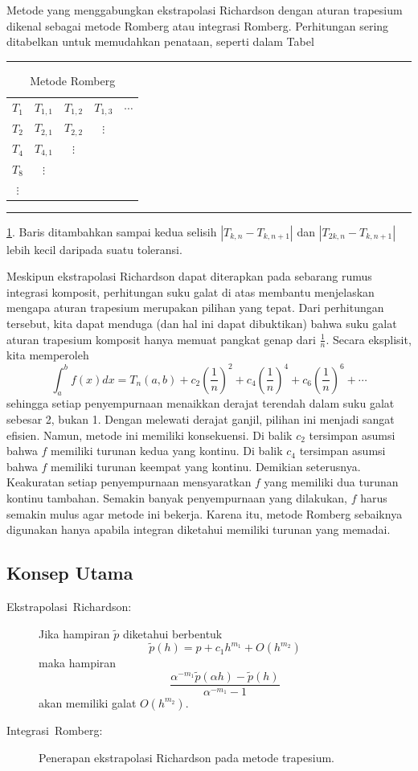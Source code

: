 Metode yang menggabungkan ekstrapolasi Richardson dengan aturan trapesium
dikenal sebagai metode Romberg atau integrasi Romberg.
Perhitungan sering ditabelkan untuk memudahkan penataan, seperti dalam
Tabel 
\begin{table}
\hrule \caption{\label{tab:Romberg}Metode Romberg}

\centering{}\medskip{}
\begin{tabular}{ccccc}
$T_{1}$ & $T_{1,1}$ & $T_{1,2}$ & $T_{1,3}$ & $\cdots$\tabularnewline
$T_{2}$ & $T_{2,1}$ & $T_{2,2}$ & $\vdots$ & \tabularnewline
$T_{4}$ & $T_{4,1}$ & $\vdots$ &  & \tabularnewline
$T_{8}$ & $\vdots$ &  &  & \tabularnewline
$\vdots$ &  &  &  & \tabularnewline
\end{tabular}\medskip{}
\hrule 
\end{table}
 \ref{tab:Romberg}. Baris ditambahkan sampai kedua selisih $\left|T_{k,n}-T_{k,n+1}\right|$
dan $\left|T_{2k,n}-T_{k,n+1}\right|$ lebih kecil daripada suatu
toleransi.

Meskipun ekstrapolasi Richardson dapat diterapkan pada sebarang rumus
integrasi komposit, perhitungan suku galat di atas membantu menjelaskan
mengapa aturan trapesium merupakan pilihan yang tepat. Dari perhitungan
tersebut, kita dapat menduga (dan hal ini dapat dibuktikan) bahwa
suku galat aturan trapesium komposit hanya memuat pangkat genap dari
$\frac{1}{n}$. Secara eksplisit, kita memperoleh
\[
\int_{a}^{b}f(x)dx=T_{n}(a,b)+c_{2}\left(\frac{1}{n}\right)^{2}+c_{4}\left(\frac{1}{n}\right)^{4}+c_{6}\left(\frac{1}{n}\right)^{6}+\cdots
\]
sehingga setiap penyempurnaan menaikkan derajat terendah dalam suku
galat sebesar 2, bukan 1. Dengan melewati derajat ganjil, pilihan
ini menjadi sangat efisien. Namun, metode ini memiliki konsekuensi.
Di balik $c_{2}$ tersimpan asumsi bahwa $f$ memiliki turunan kedua
yang kontinu. Di balik $c_{4}$ tersimpan asumsi bahwa $f$ memiliki
turunan keempat yang kontinu. Demikian seterusnya. Keakuratan setiap
penyempurnaan mensyaratkan $f$ yang memiliki dua turunan kontinu
tambahan. Semakin banyak penyempurnaan yang dilakukan, $f$ harus
semakin mulus agar metode ini bekerja. Karena itu, metode Romberg
sebaiknya digunakan hanya apabila integran diketahui memiliki turunan
yang memadai.

\subsection{Konsep Utama}
\begin{description}
\item [{Ekstrapolasi~Richardson:}] Jika hampiran $\tilde{p}$ diketahui
berbentuk
\[
\tilde{p}(h)=p+c_{1}h^{m_{1}}+O(h^{m_{2}})
\]
maka hampiran 
\[
\frac{\alpha^{-m_{1}}\tilde{p}\left(\alpha h\right)-\tilde{p}(h)}{\alpha^{-m_{1}}-1}
\]
akan memiliki galat $O(h^{m_{2}})$.
\item [{Integrasi~Romberg:}] Penerapan ekstrapolasi Richardson pada metode
trapesium.
\end{description}
\noindent\startexercises 

